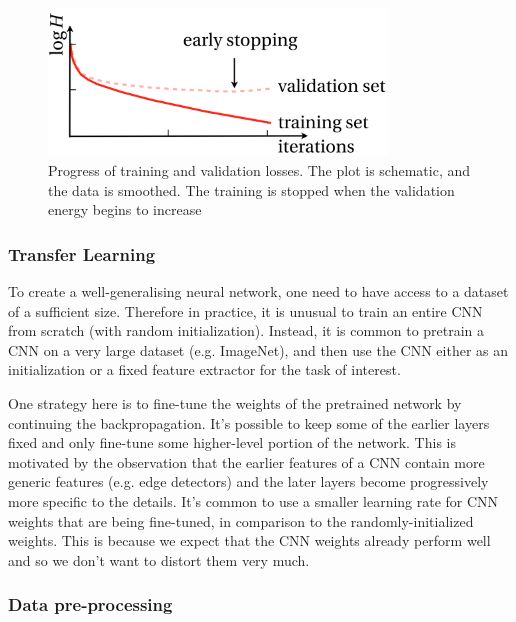 \vspace{4mm}
\begin{figure}[htb]
	\begin{center}
		\includegraphics*[width=9cm, keepaspectratio]{obr/early.png}
	\end{center}
	\vspace{4mm}
	\caption{Progress of training and validation losses. The plot is schematic, and
	the data is smoothed. The training is stopped when the validation energy begins to
	increase \cite{mehlig}} 
	\label{dropout}
\end{figure}

\subsubsection{Transfer Learning}

To create a well-generalising neural network, one need to have access to a dataset of a sufficient size. Therefore in practice, it is unusual to train an entire CNN from scratch (with random initialization). Instead, it is common to pretrain a CNN on a very large dataset (e.g. ImageNet), and then use the CNN either as an initialization or a fixed feature extractor for the task of interest. \cite{stanford-L7}

One strategy here is to fine-tune the weights of the pretrained network by continuing the backpropagation. It’s possible to keep some of the earlier layers fixed and only fine-tune some higher-level portion of the network. This is motivated by the observation that the earlier features of a CNN contain more generic features (e.g. edge detectors) and the later layers become progressively more specific to the details. It’s common to use a smaller learning rate for CNN weights that are being fine-tuned, in comparison to the randomly-initialized weights. This is because we expect that the CNN weights already perform well and so we don’t want to distort them very much. \cite{stanford-L7} \cite{stanford-github}

\subsubsection{Data pre-processing}

